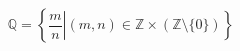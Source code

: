 \documentclass[preview]{standalone}
\begin{document}
\begin{align*}
\mathbb{Q} = \left\{\left.{\dfrac {m}{n}}\right|(m,n)\in \mathbb{Z } \times (\mathbb{Z } \setminus \{0\})\right\}
\end{align*}
\end{document}

